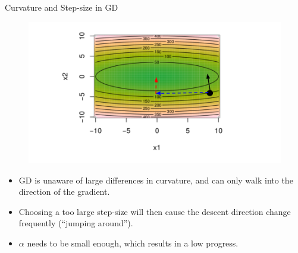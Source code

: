 \documentclass[11pt,compress,t,notes=noshow, xcolor=table]{beamer}
\begin{document}
\begin{vbframe}{Curvature and Step-size in GD}
	\vspace*{-0.4cm}
	
	\begin{figure}
		\begin{center}
			\includegraphics[width=.7\textwidth]{figure_man/curvature3.png}
		\end{center}
	\end{figure}
	
\framebreak 

\begin{itemize}

\item GD is unaware of large differences in curvature, and can only walk into the direction of the gradient.  
\item Choosing a too large step-size will then cause the descent direction change frequently (\enquote{jumping around}).
\item $\alpha$ needs to be small enough, which results in a low progress.


\end{itemize}
\end{vbframe}
\end{document}

